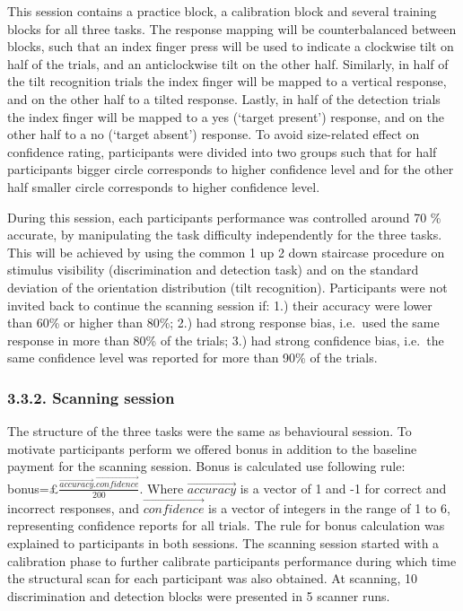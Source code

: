 \documentclass[]{article}
\begin{document}
This session contains a practice block, a calibration block and several
training blocks for all three tasks. The response mapping will be
counterbalanced between blocks, such that an index finger press will be
used to indicate a clockwise tilt on half of the trials, and an
anticlockwise tilt on the other half. Similarly, in half of the tilt
recognition trials the index finger will be mapped to a vertical
response, and on the other half to a tilted response. Lastly, in half of
the detection trials the index finger will be mapped to a yes (`target
present') response, and on the other half to a no (`target absent')
response. To avoid size-related effect on confidence rating,
participants were divided into two groups such that for half
participants bigger circle corresponds to higher confidence level and
for the other half smaller circle corresponds to higher confidence
level.

During this session, each participants performance was controlled around
70 \% accurate, by manipulating the task difficulty independently for
the three tasks. This will be achieved by using the common 1 up 2 down
staircase procedure on stimulus visibility (discrimination and detection
task) and on the standard deviation of the orientation distribution
(tilt recognition). Participants were not invited back to continue the
scanning session if: 1.) their accuracy were lower than 60\% or higher
than 80\%; 2.) had strong response bias, i.e.~used the same response in
more than 80\% of the trials; 3.) had strong confidence bias, i.e.~the
same confidence level was reported for more than 90\% of the trials.

\hypertarget{scanning-session}{%
\subsubsection{3.3.2. Scanning session}\label{scanning-session}}

The structure of the three tasks were the same as behavioural session.
To motivate participants perform we offered bonus in addition to the
baseline payment for the scanning session. Bonus is calculated use
following rule:\\
bonus=£\(\frac{\overrightarrow{accuracy}.\overrightarrow{confidence}}{200}\).
Where \(\overrightarrow{accuracy}\) is a vector of 1 and -1 for correct
and incorrect responses, and \(\overrightarrow{confidence}\) is a vector
of integers in the range of 1 to 6, representing confidence reports for
all trials. The rule for bonus calculation was explained to participants
in both sessions. The scanning session started with a calibration phase
to further calibrate participants performance during which time the
structural scan for each participant was also obtained. At scanning, 10
discrimination and detection blocks were presented in 5 scanner runs.
\end{document}
